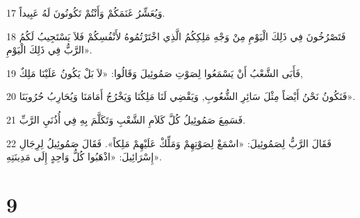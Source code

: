 \par 17 وَيُعَشِّرُ غَنَمَكُمْ وَأَنْتُمْ تَكُونُونَ لَهُ عَبِيداً.
\par 18 فَتَصْرُخُونَ فِي ذَلِكَ الْيَوْمِ مِنْ وَجْهِ مَلِكِكُمُ الَّذِي اخْتَرْتُمُوهُ لأَنْفُسِكُمْ فَلاَ يَسْتَجِيبُ لَكُمُ الرَّبُّ فِي ذَلِكَ الْيَوْمِ».
\par 19 فَأَبَى الشَّعْبُ أَنْ يَسْمَعُوا لِصَوْتِ صَمُوئِيلَ وَقَالُوا: «لاَ بَلْ يَكُونُ عَلَيْنَا مَلِكٌ,
\par 20 فَنَكُونُ نَحْنُ أَيْضاً مِثْلَ سَائِرِ الشُّعُوبِ, وَيَقْضِي لَنَا مَلِكُنَا وَيَخْرُجُ أَمَامَنَا وَيُحَارِبُ حُرُوبَنَا».
\par 21 فَسَمِعَ صَمُوئِيلُ كُلَّ كَلاَمِ الشَّعْبِ وَتَكَلَّمَ بِهِ فِي أُذُنَيِ الرَّبِّ.
\par 22 فَقَالَ الرَّبُّ لِصَمُوئِيلَ: «اسْمَعْ لِصَوْتِهِمْ وَمَلِّكْ عَلَيْهِمْ مَلِكاً». فَقَالَ صَمُوئِيلُ لِرِجَالِ إِسْرَائِيلَ: «اذْهَبُوا كُلُّ وَاحِدٍ إِلَى مَدِينَتِهِ».

\chapter{9}

